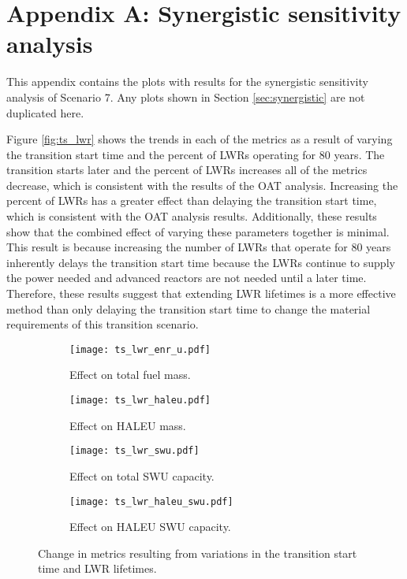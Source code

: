 \chapter{Appendix A: Synergistic sensitivity analysis}\label{app:s7_synergistic}
\renewcommand{\thetable}{A.\arabic{table}}
\setcounter{table}{0}
\renewcommand{\thefigure}{A.\arabic{figure}}
\setcounter{figure}{0}


This appendix contains the plots with results for the synergistic 
sensitivity analysis of Scenario 7. Any plots shown in Section 
\ref{sec:synergistic} are not duplicated here.

Figure \ref{fig:ts_lwr} shows the trends in each of the metrics as a result
of varying the transition start time and the percent of \glspl{LWR} 
operating for 80 years. The transition starts later and the percent of 
\glspl{LWR} increases all of the metrics decrease, which is consistent 
with the results of the \gls{OAT} analysis. Increasing the percent of 
\glspl{LWR} has a greater effect than delaying the transition start time, 
which is consistent with the \gls{OAT} analysis results.
Additionally, these results show that 
the combined effect of varying these parameters together is minimal. 
This result is because increasing the number of \glspl{LWR} that 
operate for 80 years inherently delays the transition start time 
because the \glspl{LWR} continue to supply the power needed and 
advanced reactors are not needed until a later time. Therefore, these 
results suggest that extending \gls{LWR} lifetimes is a more effective 
method than only delaying the transition start time to change the material 
requirements of this transition scenario. 

\begin{figure}
    \begin{subfigure}[h!]{0.48\textwidth}
        \centering
        \texttt{[image: ts\_lwr\_enr\_u.pdf]}
        \caption{Effect on total fuel mass.}
        \label{fig:ts_lwr_enr_u}
    \end{subfigure}
    \hfill
    \begin{subfigure}[h!]{0.48\textwidth}
        \centering
        \texttt{[image: ts\_lwr\_haleu.pdf]}
        \caption{Effect on HALEU mass.}
        \label{fig:ts_lwr_haleu}
    \end{subfigure}
    
    \begin{subfigure}[h!]{0.48\textwidth}
        \centering
        \texttt{[image: ts\_lwr\_swu.pdf]}
        \caption{Effect on total SWU capacity.}
        \label{fig:ts_lwr_swu}
    \end{subfigure}
    \hfill
    \begin{subfigure}[h!]{0.48\textwidth}
        \centering
        \texttt{[image: ts\_lwr\_haleu\_swu.pdf]}
        \caption{Effect on HALEU SWU capacity.}
        \label{fig:ts_lwr_haleu_swu}
    \end{subfigure}
    \caption{Change in metrics resulting from variations in the 
    transition start time and LWR lifetimes.}
\end{figure}

